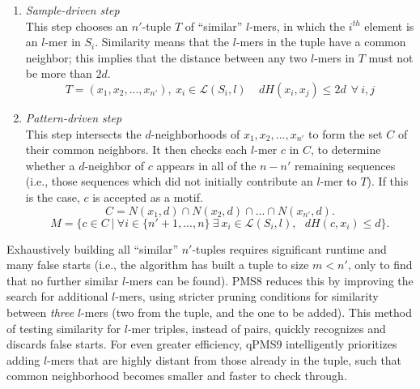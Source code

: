 \documentclass[oneside,12pt]{DISCSthesis}
\begin{document}
		\begin{enumerate}
			\item {\em Sample-driven step}\\
				This step chooses an $n'$-tuple $T$ of ``similar'' $l$-mers, in which the $i^{th}$ element is an $l$-mer in $S_i$.
				Similarity means that the $l$-mers in the tuple have a common neighbor; this implies that the distance between any two $l$-mers in $T$ must not be more than $2d$.
				\begin{equation}
					T = (x_{1}, x_{2}, ..., x_{n'}),\ x_i \in \mathcal{L}(S_i, l) \ \ \ \ \ 
					dH(x_{i}, x_{j}) \leq 2d\ \ \forall\ i,j
					\end{equation}\vspace{-5mm}
			\item {\em Pattern-driven step}\\
				This step intersects the $d$-neighborhoods of $x_{1}, x_{2}, ..., x_{n'}$ to form the set $C$ of their common neighbors. It then checks each $l$-mer $c$ in $C$, to determine whether a $d$-neighbor of $c$ appears in all of the $n-n'$ remaining sequences (i.e., those sequences which did not initially contribute an $l$-mer to $T$). If this is the case, $c$ is accepted as a motif.
				\begin{equation}
					C = N(x_{1}, d) \cap N(x_{2}, d) \cap...\cap N(x_{n'}, d).
					\end{equation} %
				\begin{equation}
					M =\{ c \in C\ |\ \forall i \in \{n'+1,...,n\}\ \exists\ x_i \in \mathcal{L}(S_i, l),\ \ \ 
					dH(c, x_i) \leq d \}.
					\end{equation}
			\end{enumerate}

		\noindent Exhaustively building all ``similar'' $n'$-tuples requires significant runtime and many false starts (i.e., the algorithm has built a tuple to size $m < n'$, only to find that no further similar $l$-mers can be found). PMS8 reduces this by improving the search for additional $l$-mers, using stricter pruning conditions for similarity between {\em three} $l$-mers (two from the tuple, and the one to be added). This method of testing similarity for $l$-mer triples, instead of pairs, quickly recognizes and discards false starts. For even greater efficiency, qPMS9 intelligently prioritizes adding $l$-mers that are highly distant from those already in the tuple, such that common neighborhood becomes smaller and faster to check through.
\end{document}
